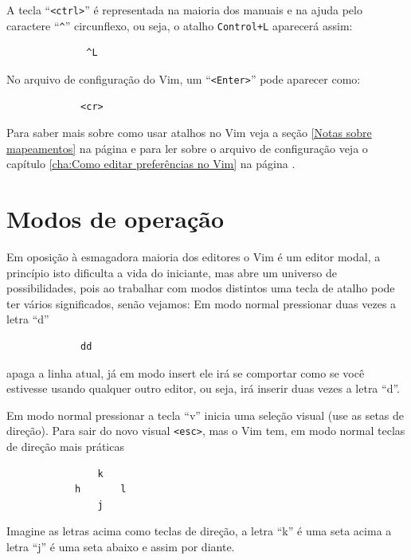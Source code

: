 \documentclass[10pt,a4paper,openany]{book}
\begin{document}
A tecla ``\verb|<ctrl>|'' é representada na maioria dos manuais e na ajuda
pelo caractere ``\verb|^|'' circunflexo, ou seja, o atalho \verb|Control+L| aparecerá assim:

\begin{verbatim}
			  ^L
\end{verbatim}

No arquivo de configuração do Vim, um ``\verb|<Enter>|'' pode aparecer como:

\begin{verbatim}
			 <cr>
\end{verbatim}

Para saber mais sobre como usar atalhos no Vim veja a seção \ref{Notas sobre
mapeamentos} na página \pageref{Notas sobre mapeamentos} e para ler sobre o
arquivo de configuração veja o capítulo \ref{cha:Como editar preferências no Vim} na página
\pageref{cha:Como editar preferências no Vim}.


\section{Modos de operação}\label{Modos de operação}

Em oposição à esmagadora maioria dos editores o Vim é um editor modal, a
princípio isto dificulta a vida do iniciante, mas abre um universo de
possibilidades, pois ao trabalhar com modos distintos uma tecla de
atalho pode ter vários significados, senão vejamos:
Em modo normal pressionar duas vezes a letra ``d''
\begin{verbatim}
			 dd
\end{verbatim}
apaga a linha atual, já em modo insert ele irá se comportar como se você estivesse
usando qualquer outro editor, ou seja, irá inserir duas vezes a letra ``d''.

Em modo normal pressionar a tecla ``v'' inicia uma seleção visual (use as setas de direção).
Para sair do novo visual \verb|<esc>|, mas o Vim tem, em modo normal teclas de direção mais práticas

\begin{verbatim}
				k
			h		l
				j
\end{verbatim}

Imagine as letras acima como teclas de direção, a letra ``k'' é uma seta acima
a letra ``j'' é uma seta abaixo e assim por diante.

\end{document}

